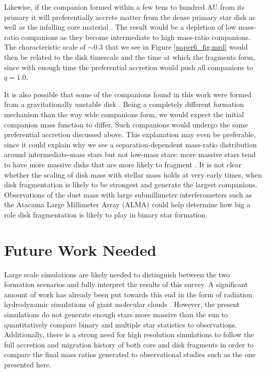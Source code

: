 \documentclass{utthesis}
\begin{document}
Likewise, if the companion formed within a few tens to hundred AU from its primary it will preferentially accrete matter from the dense primary star disk as well as the infalling core material \citep{BBB2002}. The result would be a depletion of low mass-ratio companions as they become intermediate to high mass-ratio companions. The characteristic scale of $\sim 0.3$ that we see in Figure \ref{paper6_fig:mrd} would then be related to the disk timescale and the time at which the fragments form, since with enough time the preferential accretion would push all companions to $q = 1.0$. 

It is also possible that some of the companions found in this work were formed from a gravitationally unstable disk \citep[e.g.][]{Kratter2006, Stamatellos2011}. Being a completely different formation mechanism than the way wide companions form, we would expect the initial companion mass function to differ. Such companions would undergo the same preferential accretion discussed above. This explanation may even be preferable, since it could explain why we see a separation-dependent mass-ratio distribution around intermediate-mass stars but not low-mass stars: more massive stars tend to have more massive disks \citep{Andrews2013} that are more likely to fragment \citep{Kratter2010}. It is not clear whether the scaling of disk mass with stellar mass holds at very early times, when disk fragmentation is likely to be strongest and generate the largest companions. Observations of the dust mass with large submillimeter interferometers such as the Atacama Large Millimeter Array (ALMA) could help determine how big a role disk fragmentation is likely to play in binary star formation.
 



\section{Future Work Needed}

Large scale simulations are likely needed to distinguish between the two formation scenarios and fully interpret the results of this survey. A significant amount of work has already been put towards this end in the form of radiation hydrodynamic simulations of giant molecular clouds \citep{Bate2012, Krumholz2012}. However, the present simulations do not generate enough stars more massive than the sun to quantitatively compare binary and multiple star statistics to observations. Additionally, there is a strong need for high resolution simulations to follow the full accretion and migration history of both core and disk fragments in order to compare the final mass ratios generated to observational studies such as the one presented here.
\end{document}
